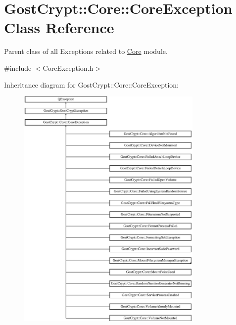 \hypertarget{class_gost_crypt_1_1_core_1_1_core_exception}{}\section{Gost\+Crypt\+:\+:Core\+:\+:Core\+Exception Class Reference}
\label{class_gost_crypt_1_1_core_1_1_core_exception}


Parent class of all Exceptions related to \hyperlink{namespace_gost_crypt_1_1_core}{Core} module.  




{\ttfamily \#include $<$Core\+Exception.\+h$>$}

Inheritance diagram for Gost\+Crypt\+:\+:Core\+:\+:Core\+Exception\+:\begin{figure}[H]
\begin{center}
\leavevmode
\includegraphics[height=12.000000cm]{class_gost_crypt_1_1_core_1_1_core_exception}
\end{center}
\end{figure}
